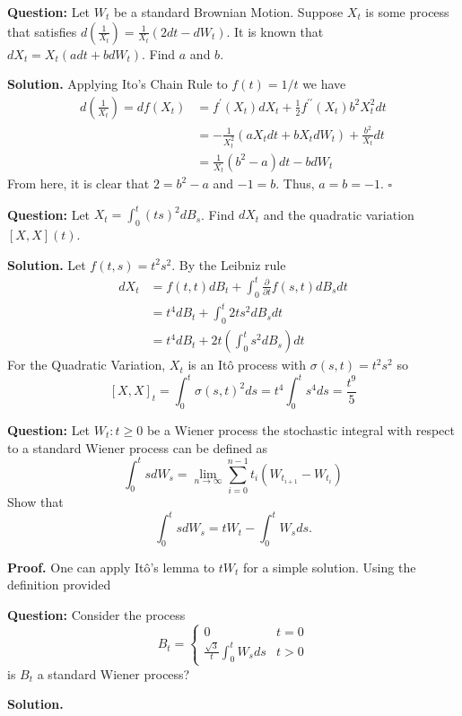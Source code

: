 \documentclass{article}
\begin{document}
\begin{tcolorbox}[colframe=black,colback=gray!5,boxrule=0.5pt]
\textbf{Question:} Let $W_t$ be a standard Brownian Motion. Suppose $X_t$ is some process that satisfies $d(\frac{1}{X_t}) = \frac{1}{X_t}(2dt-dW_t)$. It is known that $dX_t = X_t(adt + bdW_t)$. Find $a$ and $b$.
\end{tcolorbox}
\textbf{Solution.} Applying Ito's Chain Rule to $f(t) = 1/t$ we have 
\begin{align*}
    d\left(\frac{1}{X_t}\right) = df(X_t) &=  f^\prime(X_t)dX_t + \frac{1}{2}f^{\prime\prime}(X_t)b^2X_t^2dt \\
    &= -\frac{1}{X_t^2}(aX_tdt + bX_tdW_t) + \frac{b^2}{X_t}dt \\
&= \frac{1}{X_t}(b^2-a)dt-bdW_t
\end{align*}
From here, it is clear that $2 = b^2-a$ and $-1 = b$. Thus, $a=b=-1$. $\square$

\begin{tcolorbox}[colframe=black,colback=gray!5,boxrule=0.5pt]
\textbf{Question:} Let $X_t = \int_0^t (ts)^2dB_s$. Find $dX_t$ and the quadratic variation $[X,X](t)$.
\end{tcolorbox}
\textbf{Solution.} Let $f(t,s) = t^2s^2$. By the Leibniz rule 
\begin{align*}
    dX_t &= f(t,t)dB_t + \int_0^t \frac{\partial}{\partial t}f(s,t) dB_sdt  \\
         &= t^4dB_t + \int_0^t 2ts^2dB_sdt \\
         &= t^4dB_t + 2t \left(\int_0^t s^2dB_s\right)dt
\end{align*}
For the Quadratic Variation, $X_t$ is an Itô process with $\sigma(s,t) = t^2 s^2$ so
$$[X,X]_t = \int_0^t \sigma(s,t)^2 ds = t^4\int_0^t s^4ds = \frac{t^9}{5}$$

\begin{tcolorbox}[colframe=black,colback=gray!5,boxrule=0.5pt]
\textbf{Question:} Let $W_t : t\geq0$ be a Wiener process the stochastic integral with respect to a standard Wiener process can be defined as 
$$\int_0^ts dW_s = \lim_{n\to\infty}\sum_{i=0}^{n-1}t_i(W_{t_{i+1} } - W_{t_i})$$
Show that 
$$\int_0^tsdW_s = tW_t - \int_0^tW_sds.$$
\end{tcolorbox}
\textbf{Proof.} One can apply Itô's lemma to $tW_t$ for a simple solution. Using the definition provided


\begin{tcolorbox}[colframe=black,colback=gray!5,boxrule=0.5pt]
\textbf{Question:} Consider the process 
$$
B_t = \begin{cases}
    0 & t=0 \\
    \frac{\sqrt{3}}{t}\int_0^tW_s ds & t>0
\end{cases}
$$
is $B_t$ a standard Wiener process? 
\end{tcolorbox}
\textbf{Solution.}
\end{document}
